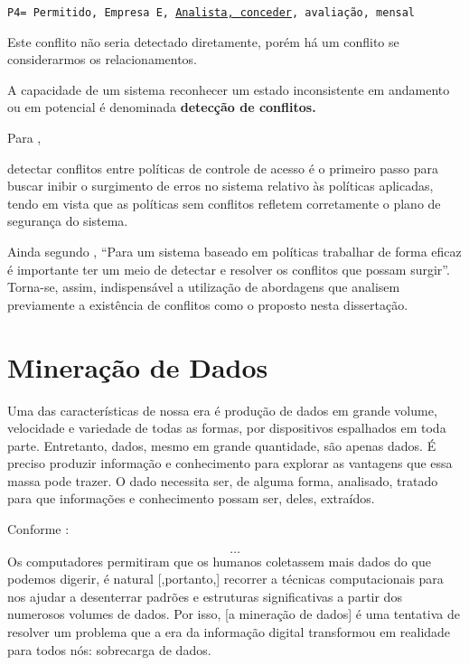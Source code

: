 {\scriptsize \texttt{P4= {Permitido, Empresa E, \underline{Analista, conceder}, avaliação, mensal}}}

Este conflito não seria detectado diretamente, porém há um conflito se considerarmos os relacionamentos.

A capacidade de um sistema reconhecer um estado inconsistente em andamento ou em potencial é denominada \textbf{detecção de conflitos.}

Para ,
\begin{citacao}
	detectar conflitos entre políticas de controle de acesso é o primeiro passo para buscar inibir o surgimento de erros no sistema relativo às políticas aplicadas, tendo em vista que as políticas sem conflitos refletem corretamente o plano de segurança do sistema.
\end{citacao}

Ainda segundo , ``Para um sistema baseado em políticas trabalhar de forma eficaz é importante ter um meio de detectar e resolver os conflitos que possam surgir''. Torna-se, assim, indispensável a utilização de abordagens que analisem previamente a existência de conflitos como o proposto nesta dissertação.


\section{Mineração de Dados}\label{mineracao_dados}
Uma das características de nossa era é produção de dados em grande volume, velocidade e variedade de todas as formas, por dispositivos espalhados em toda parte. Entretanto, dados, mesmo em grande quantidade, são apenas dados. É preciso produzir informação e conhecimento para explorar as vantagens que essa massa pode trazer. O dado necessita ser, de alguma forma, analisado, tratado para que informações e conhecimento possam ser, deles, extraídos. \cite{aprenda_mineracao_fernando_amaral16} \cite{ferrari2017}

Conforme :
\begin{citacao}
	\[ \dots \] Os computadores permitiram que os humanos coletassem mais dados do que podemos digerir, é natural [,portanto,] recorrer a técnicas computacionais para nos ajudar a desenterrar padrões e estruturas significativas a partir dos numerosos volumes de dados. Por isso, [a mineração de dados] é uma tentativa de resolver um problema que a era da informação digital transformou em realidade para todos nós: sobrecarga de dados.
\end{citacao}


